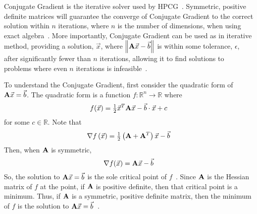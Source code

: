 Conjugate Gradient is the iterative solver used by HPCG~\cite{Dongarra:2015:HPCG}.
Symmetric, positive definite matrices will guarantee the converge of Conjugate Gradient to the correct solution within \(n\) iterations, where \(n\) is the number of dimensions, when using exact algebra~\cite{Saad:2003:IterativeMethods}.
More importantly, Conjugate Gradient can be used as in iterative method, providing a solution, \(\vec{x}\), where \(\left\|\mathbf{A}\vec{x}-\vec{b}\right\|\) is within some tolerance, \(\epsilon\), after significantly fewer than \(n\) iterations, allowing it to find solutions to problems where even \(n\) iterations is infeasible~\cite{Shewchuk:1994:IntroToCG}.

To understand the Conjugate Gradient, first consider the quadratic form of \(\mathbf{A}\vec{x} = \vec{b}\).
The quadratic form is a function \(f:\mathbb{R}^n\to\mathbb{R}\) where
\begin{equation}
\label{eq:cg-quad-form}
	f(\vec{x}) = \tfrac{1}{2}\vec{x}^T\mathbf{A}\vec{x} - \vec{b}\cdot\vec{x} + c
\end{equation}
for some \(c\in\mathbb{R}\).
Note that
\[
	\nabla f\left(\vec{x}\right) = \tfrac{1}{2}\left(\mathbf{A}+\mathbf{A}^T\right)\vec{x}-\vec{b}
\]
Then, when \(\mathbf{A}\) is symmetric,
\begin{equation*}
	\nabla f(\vec{x}) = \mathbf{A}\vec{x} - \vec{b}
\end{equation*}
So, the solution to \(\mathbf{A}\vec{x} = \vec{b}\) is the sole critical point of \(f\)~\cite{Nearing:2010:toolsForPhysics}.
Since \(\mathbf{A}\) is the Hessian matrix of \(f\) at the point, if \(\mathbf{A}\) is positive definite, then that critical point is a minimum.
Thus, if \(\mathbf{A}\) is a symmetric, positive definite matrix, then the minimum of \(f\) is the solution to \(\mathbf{A}\vec{x} = \vec{b}\)~\cite{Shewchuk:1994:IntroToCG}.

